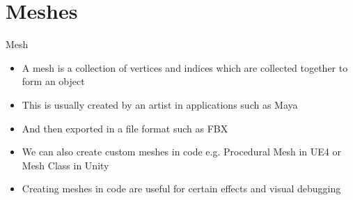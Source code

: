 \part{Meshes}
\frame{\partpage}

\begin{frame}{Mesh}
\begin{itemize}
	\item A mesh is a collection of vertices and indices which are collected together to form an object
	\pause\item This is usually created by an artist in applications such as Maya
	\pause\item And then exported in a file format such as FBX
	\pause\item We can also create custom meshes in code e.g. Procedural Mesh in UE4 or Mesh Class in Unity
	\pause\item Creating meshes in code are useful for certain effects and visual debugging
\end{itemize}
\end{frame}

